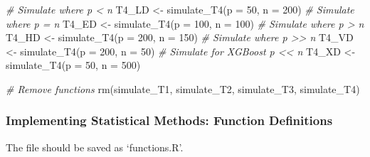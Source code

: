 \documentclass[
  11pt,
]{article}
\newenvironment{Shaded}{}{}
\newcommand{\AttributeTok}[1]{\textcolor[rgb]{0.49,0.56,0.16}{#1}}
\newcommand{\CommentTok}[1]{\textcolor[rgb]{0.38,0.63,0.69}{\textit{#1}}}
\newcommand{\DecValTok}[1]{\textcolor[rgb]{0.25,0.63,0.44}{#1}}
\newcommand{\FunctionTok}[1]{\textcolor[rgb]{0.02,0.16,0.49}{#1}}
\newcommand{\NormalTok}[1]{#1}
\newcommand{\OtherTok}[1]{\textcolor[rgb]{0.00,0.44,0.13}{#1}}
\begin{document}
\begin{Shaded}
\begin{Highlighting}[]
\CommentTok{\# Simulate where p \textless{} n}
\NormalTok{T4\_LD }\OtherTok{\textless{}{-}} \FunctionTok{simulate\_T4}\NormalTok{(}\AttributeTok{p =} \DecValTok{50}\NormalTok{, }\AttributeTok{n =} \DecValTok{200}\NormalTok{)}
\CommentTok{\# Simulate where p = n}
\NormalTok{T4\_ED }\OtherTok{\textless{}{-}} \FunctionTok{simulate\_T4}\NormalTok{(}\AttributeTok{p =} \DecValTok{100}\NormalTok{, }\AttributeTok{n =} \DecValTok{100}\NormalTok{)}
\CommentTok{\# Simulate where p \textgreater{} n}
\NormalTok{T4\_HD }\OtherTok{\textless{}{-}} \FunctionTok{simulate\_T4}\NormalTok{(}\AttributeTok{p =} \DecValTok{200}\NormalTok{, }\AttributeTok{n =} \DecValTok{150}\NormalTok{)}
\CommentTok{\# Simulate where p \textgreater{}\textgreater{} n}
\NormalTok{T4\_VD }\OtherTok{\textless{}{-}} \FunctionTok{simulate\_T4}\NormalTok{(}\AttributeTok{p =} \DecValTok{200}\NormalTok{, }\AttributeTok{n =} \DecValTok{50}\NormalTok{)}
\CommentTok{\# Simulate for XGBoost p \textless{}\textless{} n}
\NormalTok{T4\_XD }\OtherTok{\textless{}{-}} \FunctionTok{simulate\_T4}\NormalTok{(}\AttributeTok{p =} \DecValTok{50}\NormalTok{, }\AttributeTok{n =} \DecValTok{500}\NormalTok{)}

\CommentTok{\# Remove functions}
\FunctionTok{rm}\NormalTok{(simulate\_T1, simulate\_T2, simulate\_T3, simulate\_T4)}
\end{Highlighting}
\end{Shaded}

\subsubsection{Implementing Statistical Methods: Function Definitions}

The file should be saved as `functions.R'.
\end{document}
